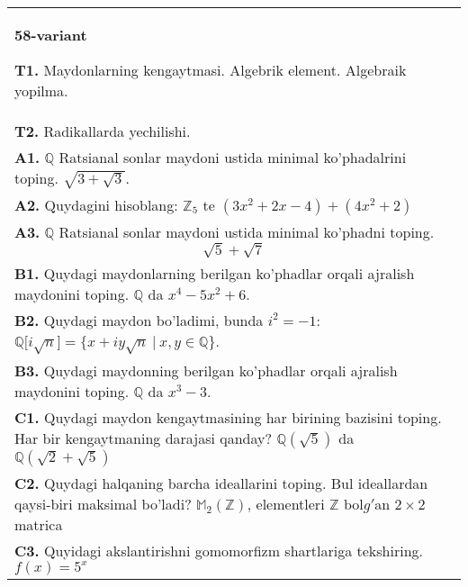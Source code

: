 \documentclass{article}
\begin{document}
\begin{tabular}{m{17cm}}
\textbf{58-variant}
\newline

\textbf{T1.} Maydonlarning kengaytmasi. Algebrik element. Algebraik yopilma. \\
\textbf{T2.} Radikallarda yechilishi. \\
\textbf{A1.} \(\mathbb{Q}\) Ratsianal sonlar maydoni ustida minimal ko'phadalrini toping.
\(\sqrt{3 + \sqrt{3}}\). \\
\textbf{A2.} Quydagini hisoblang:
\(\mathbb{Z}_{5}\) te \(\left( 3x^{2} + 2x - 4 \right) + \left( 4x^{2} + 2 \right)\) \\
\textbf{A3.} \(\mathbb{Q}\) Ratsianal sonlar maydoni ustida minimal ko'phadni toping.
\[\sqrt{5} + \sqrt{7}\] \\
\textbf{B1.} Quydagi maydonlarning berilgan ko'phadlar orqali ajralish maydonini toping.
\(\mathbb{Q}\) da \(x^{4} - 5x^{2} + 6\). \\
\textbf{B2.} Quydagi maydon bo'ladimi, bunda \(i^{2} = - 1\):
\(\mathbb{Q\lbrack}i\sqrt{n}\rbrack = \{ x + iy\sqrt{n}\ |\ x,y \in \mathbb{Q\}}\). \\
\textbf{B3.} Quydagi maydonning berilgan ko'phadlar orqali ajralish maydonini toping.
\(\mathbb{Q}\) da \(x^{3} - 3\). \\
\textbf{C1.} Quydagi maydon kengaytmasining har birining bazisini toping. Har bir kengaytmaning darajasi qanday?
\(\mathbb{Q}\left( \sqrt{5} \right)\) da \(\mathbb{Q}\left( \sqrt{2} + \sqrt{5} \right)\) \\
\textbf{C2.} Quydagi halqaning barcha ideallarini toping. Bul ideallardan qaysi-biri maksimal bo'ladi?
\(\mathbb{M}_{2}\left( \mathbb{Z} \right)\), elementleri \(\mathbb{Z}\) bol\(g'\)an \(2 \times 2\) matrica \\
\textbf{C3.} Quyidagi akslantirishni gomomorfizm shartlariga tekshiring. \(f(x) = 5^{x}\) \\

\end{tabular}
\vspace{1cm}
\end{document}
